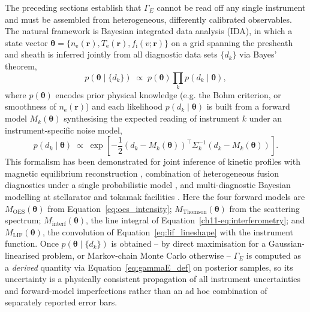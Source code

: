 The preceding sections establish that $\Gamma_{E}$ cannot be read off any single instrument and must be assembled from heterogeneous, differently calibrated observables. The natural framework is Bayesian integrated data analysis (IDA), in which a state vector $\boldsymbol{\theta} = \{n_{\mathrm{e}}(\mathbf{r}), T_{\mathrm{e}}(\mathbf{r}), f_{\mathrm{i}}(v; \mathbf{r})\}$ on a grid spanning the presheath and sheath is inferred jointly from all diagnostic data sets $\{d_{k}\}$ via Bayes' theorem,
\begin{equation}
p(\boldsymbol{\theta} \mid \{d_{k}\}) \;\propto\; p(\boldsymbol{\theta}) \prod_{k} p(d_{k} \mid \boldsymbol{\theta}),
\label{eq:bayes_ida}
\end{equation}
where $p(\boldsymbol{\theta})$ encodes prior physical knowledge (e.g. the Bohm criterion, or smoothness of $n_{\mathrm{e}}(\mathbf{r})$) and each likelihood $p(d_{k} \mid \boldsymbol{\theta})$ is built from a forward model $M_{k}(\boldsymbol{\theta})$ synthesising the expected reading of instrument $k$ under an instrument-specific noise model,
\begin{equation}
p(d_{k} \mid \boldsymbol{\theta}) \;\propto\; \exp\!\left[-\frac{1}{2}\left(d_{k} - M_{k}(\boldsymbol{\theta})\right)^{\!\top} \Sigma_{k}^{-1} \left(d_{k} - M_{k}(\boldsymbol{\theta})\right)\right].
\label{eq:likelihood_k}
\end{equation}
This formalism has been demonstrated for joint inference of kinetic profiles with magnetic equilibrium reconstruction \cite{ref0706}, combination of heterogeneous fusion diagnostics under a single probabilistic model \cite{ref0707}, and multi-diagnostic Bayesian modelling at stellarator and tokamak facilities \cite{ref0713}. Here the four forward models are $M_{\mathrm{OES}}(\boldsymbol{\theta})$ from Equation~\eqref{eq:oes_intensity}; $M_{\mathrm{Thomson}}(\boldsymbol{\theta})$ from the scattering spectrum; $M_{\mathrm{interf}}(\boldsymbol{\theta})$, the line integral of Equation~\eqref{ch11-eq:interferometry}; and $M_{\mathrm{LIF}}(\boldsymbol{\theta})$, the convolution of Equation~\eqref{eq:lif_lineshape} with the instrument function. Once $p(\boldsymbol{\theta} \mid \{d_{k}\})$ is obtained -- by direct maximisation for a Gaussian-linearised problem, or Markov-chain Monte Carlo otherwise \cite{ref0710,ref0727} -- $\Gamma_{E}$ is computed as a \emph{derived} quantity via Equation~\eqref{eq:gammaE_def} on posterior samples, so its uncertainty is a physically consistent propagation of all instrument uncertainties and forward-model imperfections rather than an ad hoc combination of separately reported error bars.

